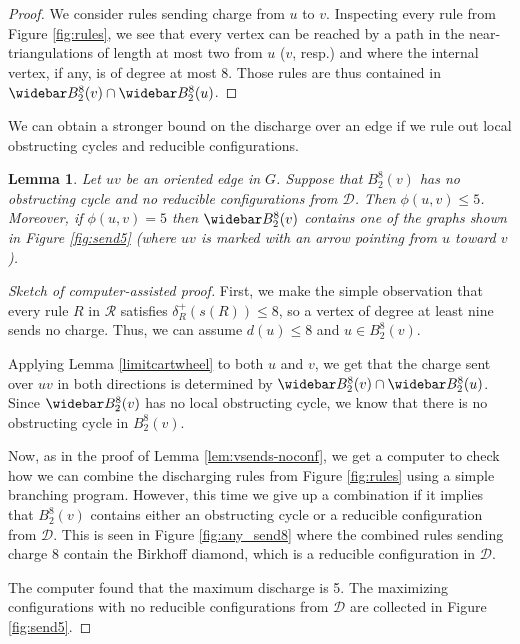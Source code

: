 \documentclass[10pt,a4paper]{article}
\newtheorem{lem}[thm]{Lemma}
\renewcommand{\bar}{\widebar}
\def\cD{{\mathcal D}}
\def\showlabel#1{}
\begin{document}
\begin{proof} 
We consider rules sending
charge from $u$ to $v$. Inspecting every rule from Figure \ref{fig:rules}, we see
that every vertex can be reached by a path in the near-triangulations of length at most two from $u$ ($v$, resp.) and where the internal vertex, if any, is of degree at most 8. Those rules are thus
contained in $\bar B_2^8(v)\cap\bar B_2^8(u)$.  
\end{proof}

We can obtain a stronger bound on the discharge over an edge if we rule out
local obstructing cycles and reducible configurations.

\begin{lem}\label{lem:vsends}\showlabel{lem:vsends}
 Let $uv$ be an oriented edge in $G$. 
Suppose that $B^8_2(v)$ has no obstructing cycle and
no reducible  configurations from $\mathcal{D}$. Then $\phi(u,v)\leq 5$.
Moreover, if $\phi(u,v)=5$ then $\bar B^8_2(v)$
contains one of the graphs shown in Figure \ref{fig:send5} (where $uv$ is marked with an arrow pointing from $u$ toward $v$).
\end{lem}



\begin{proof}[Sketch of computer-assisted proof]
First, we make the simple observation that every rule $R$ in $\mathcal{R}$ satisfies $\delta^+_R(s(R)) \leq 8$, so a vertex of degree at least nine sends no charge. Thus, we can assume $d(u)\leq 8$ and $u\in B_2^8(v)$.

Applying Lemma \ref{limitcartwheel} to both $u$ and $v$,
we get that the charge sent over $uv$ in both directions is determined by $\bar B^8_2(v)\cap \bar B^8_2(u)$. Since $\bar B^8_2(v)$ has no local obstructing cycle, we know that there is no obstructing cycle in $B^8_2(v)$. 

Now, as in the proof of Lemma \ref{lem:vsends-noconf}, we get a computer to check how we can combine the discharging rules from Figure \ref{fig:rules} using a simple branching program. 
However, this time we give up a combination if it implies that $B_2^8(v)$ contains either an obstructing cycle or a reducible configuration from $\mathcal D$. This is seen in Figure \ref{fig:any_send8} where the combined rules sending charge 8 contain the Birkhoff diamond, which is a reducible configuration in $\cD$.

The computer found that the maximum discharge is 5. The maximizing configurations with no reducible configurations from $\cD$ are collected in Figure \ref{fig:send5}.
\end{proof}
\end{document}
